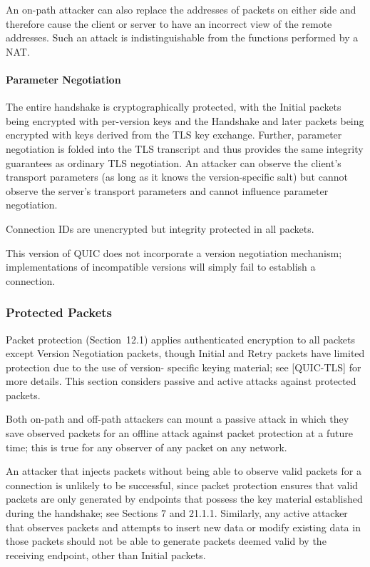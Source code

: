 \documentclass{article}
\begin{document}
An on-path attacker can also replace the addresses of packets on either side and therefore cause the client or server to have an incorrect view of the remote addresses.  Such an attack is indistinguishable from the functions performed by a NAT.

\paragraph{Parameter Negotiation}

The entire handshake is cryptographically protected, with the Initial packets being encrypted with per-version keys and the Handshake and later packets being encrypted with keys derived from the TLS key exchange.  Further, parameter negotiation is folded into the TLS transcript and thus provides the same integrity guarantees as ordinary TLS negotiation.  An attacker can observe the client's transport parameters (as long as it knows the version-specific salt) but cannot observe the server's transport parameters and cannot influence parameter negotiation.

Connection IDs are unencrypted but integrity protected in all packets.

This version of QUIC does not incorporate a version negotiation mechanism; implementations of incompatible versions will simply fail to establish a connection.

\subsubsection{Protected Packets}

Packet protection (Section~12.1) applies authenticated encryption to all packets except Version Negotiation packets, though Initial and Retry packets have limited protection due to the use of version- specific keying material; see [QUIC-TLS] for more details.  This section considers passive and active attacks against protected packets.

Both on-path and off-path attackers can mount a passive attack in which they save observed packets for an offline attack against packet protection at a future time; this is true for any observer of any packet on any network.

An attacker that injects packets without being able to observe valid packets for a connection is unlikely to be successful, since packet protection ensures that valid packets are only generated by endpoints that possess the key material established during the handshake; see Sections 7 and 21.1.1.  Similarly, any active attacker that observes packets and attempts to insert new data or modify existing data in those packets should not be able to generate packets deemed valid by the receiving endpoint, other than Initial packets.
\end{document}

